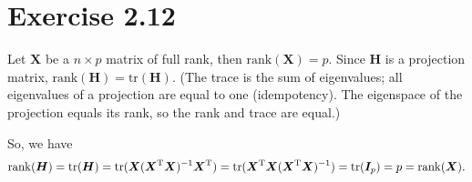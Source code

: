 \section*{Exercise 2.12}
Let $\bm{X}$ be a $n \times p$ matrix of full rank, then $\mathrm{rank}(\bm{X}) = p$. Since $\bm{H}$ is a projection matrix, $\mathrm{rank}(\bm{H}) = \mathrm{tr}(\bm{H})$. (The trace is the sum of eigenvalues; all eigenvalues of a projection are equal to one (idempotency). The eigenspace of the projection equals its rank, so the rank and trace are equal.)

So, we have
\begin{align*}
\mathrm{rank}(\bm{H}) = \mathrm{tr}(\bm{H}) = \mathrm{tr}(\bm{X}(\bm{X}^{\rm T}\bm{X})^{-1}\bm{X}^{\rm T}) = \mathrm{tr}(\bm{X}^{\rm T}\bm{X}(\bm{X}^{\rm T}\bm{X})^{-1}) = \mathrm{tr}(\bm{I}_{p}) = p = \mathrm{rank}(\bm{X}).
\end{align*}